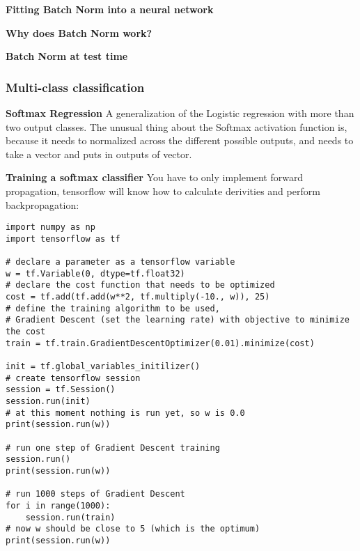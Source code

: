 \textbf{Fitting Batch Norm into a neural network}

\textbf{Why does Batch Norm work?}

\textbf{Batch Norm at test time}

\subsubsection*{Multi-class classification}

\textbf{Softmax Regression} A generalization of the Logistic regression with more than two output classes. The unusual thing about the Softmax activation function is, because it needs to normalized across the different possible outputs, and needs to take a vector and puts in outputs of vector. 

\textbf{Training a softmax classifier} You have to only implement forward propagation, tensorflow will know how to calculate derivities and perform backpropagation:
\begin{lstlisting}
import numpy as np
import tensorflow as tf

# declare a parameter as a tensorflow variable
w = tf.Variable(0, dtype=tf.float32)
# declare the cost function that needs to be optimized
cost = tf.add(tf.add(w**2, tf.multiply(-10., w)), 25)
# define the training algorithm to be used,
# Gradient Descent (set the learning rate) with objective to minimize the cost
train = tf.train.GradientDescentOptimizer(0.01).minimize(cost)

init = tf.global_variables_initilizer()
# create tensorflow session
session = tf.Session()
session.run(init)
# at this moment nothing is run yet, so w is 0.0
print(session.run(w))

# run one step of Gradient Descent training
session.run()
print(session.run(w))

# run 1000 steps of Gradient Descent
for i in range(1000):
    session.run(train)
# now w should be close to 5 (which is the optimum)
print(session.run(w))
\end{lstlisting}


